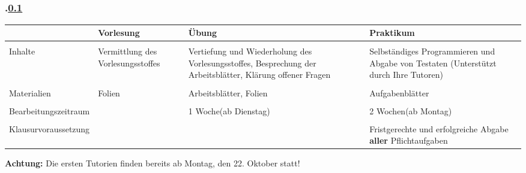\subsection{\stitle}\label{S:Einordnung}
\begin{frame}[fragile]%
  \frametitle{\kap.\ref{S:Einordnung} \stitle}%
  \medskip

  \small
  \centering
  \begin{tabular}{p{2cm}|p{2.0cm}|p{2.7cm}|p{3.0cm}}
  & {\centering Vorlesung} & {\centering \"Ubung} & {\centering Praktikum}\\
  \hline
  \hline & & &  \\
  Inhalte & Vermittlung des Vorlesungsstoffes & Vertiefung und Wiederholung des Vorlesungsstoffes, Besprechung der Arbeitsbl\"atter, Kl\"arung offener Fragen & Selbst\"andiges Programmieren und Abgabe von Testaten (Unterst\"utzt durch Ihre Tutoren)\\
  \hline & & & \\
  Materialien & Folien & Arbeitsbl\"atter, Folien & Aufgabenbl\"atter\\
  \hline & & & \\
  Be\-ar\-bei\-tungs\-zeit\-raum & & 1 Woche\newline (ab Dienstag) & 2 Wochen\newline  (ab Montag)\\
  \hline & & & \\
  Klau\-sur\-vo\-r\-aus\-set\-zung & & & Fristgerechte und erfolgreiche Abgabe \textbf{aller} Pflichtaufgaben\\
  \end{tabular}
  \medskip

  \textbf{Achtung:} Die ersten Tutorien finden bereits ab Montag, den 22. Oktober statt!
\end{frame}
